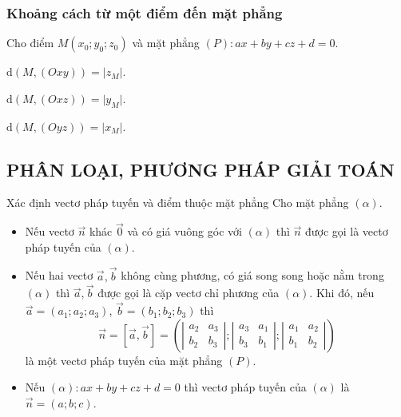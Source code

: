 \subsubsection{Khoảng cách từ một điểm đến mặt phẳng}
Cho điểm $M(x_0;y_0;z_0)$ và mặt phẳng $(P) \colon ax+by+cz+d=0$.
	\iconMT {} 
	\begin{listEX}[3]
		\item [\ding{172}] $\mathrm{d}\left(M,(Oxy) \right)=\big|z_M\big|$.
		\item [\ding{173}]  $\mathrm{d}\left(M,(Oxz) \right)=\big|y_M\big|$.
		\item [\ding{174}]  $\mathrm{d}\left(M,(Oyz) \right)=\big|x_M\big|$.
	\end{listEX}
\subsection{PHÂN LOẠI, PHƯƠNG PHÁP GIẢI TOÁN}
\begin{dang}{Xác định vectơ pháp tuyến và điểm thuộc mặt phẳng}
	Cho mặt phẳng $(\alpha)$.
	\begin{itemize}
		\item  [\ding{172}] Nếu vectơ $\overrightarrow{n}$ khác $\overrightarrow{0}$ và có giá vuông góc với $(\alpha)$ thì $\overrightarrow{n}$ được gọi là vectơ pháp tuyến của $(\alpha)$.
		\item  [\ding{173}] Nếu hai vectơ $\overrightarrow{a}, \overrightarrow{b}$ không cùng phương, có giá song song hoặc nằm trong $(\alpha)$ thì $\overrightarrow{a}, \overrightarrow{b}$ được gọi là cặp vectơ chỉ phương của $(\alpha)$. Khi đó, nếu $\vec{a}=(a_1;a_2;a_3)$, $\vec{b}=(b_1;b_2;b_3)$ thì
		$$\vec{n}= [\vec{a}, \vec{b}]=\left(\left|\begin{array}{ll}a_2 & a_3 \\ b_2 & b_3\end{array}\right| ;\left|\begin{array}{ll}a_3 & a_1 \\ b_3 & b_1\end{array}\right| ;\left|\begin{array}{ll}a_1 & a_2 \\ b_1 & b_2\end{array}\right|\right)$$ là một vectơ pháp tuyến của mặt phẳng $(P)$.
		\item [\ding{174}] Nếu $(\alpha) \colon ax + by + cz + d = 0$ thì vectơ pháp tuyến của $(\alpha)$ là $\vec{n}=(a;b;c)$.
	\end{itemize}
\end{dang}
\viduminhhoa

